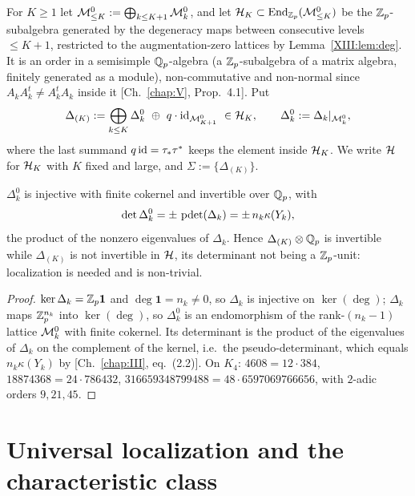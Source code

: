 \begin{definition}\label{XIII:def:order}
For $K\ge1$ let $\mathcal{M}^{0}_{\le K}:=\bigoplus_{k\le K+1}\mathcal{M}^{0}_k$, and let
$\mathcal{H}_K\subset\operatorname{End}_{\mathbb{Z}_p}(\mathcal{M}^{0}_{\le K})$ be the $\mathbb{Z}_p$-subalgebra generated by the degeneracy
maps between consecutive levels $\le K{+}1$, restricted to the augmentation-zero lattices by
Lemma~\ref{XIII:lem:deg}. It is an order in a semisimple $\mathbb{Q}_p$-algebra (a $\mathbb{Z}_p$-subalgebra of a
matrix algebra, finitely generated as a module), non-commutative and non-normal since
$A_kA_k^{t}\ne A_k^{t}A_k$ inside it {\rm[Ch.~\ref{chap:V}, Prop.~4.1]}. Put
\[
\Delta_{(K)}:=\bigoplus_{k\le K}\Delta_k^{0}\ \oplus\ q\cdot\mathrm{id}_{\cM^{0}_{K+1}}\ \in\cH_K,
\qquad \Delta_k^{0}:=\Delta_k|_{\cM^{0}_k},
\]
where the last summand $q\,\mathrm{id}=\tau_*\tau^*$ keeps the element inside $\mathcal{H}_K$. We write
$\mathcal{H}$ for $\mathcal{H}_K$ with $K$ fixed and large, and $\Sigma:=\{\Delta_{(K)}\}$.
\end{definition}

\begin{proposition}\label{XIII:prop:sigma}
$\Delta_k^{0}$ is injective with finite cokernel and invertible over $\mathbb{Q}_p$, with
\[
\det\Delta_k^{0}=\pm\,\operatorname{pdet}(\Delta_k)=\pm\,n_k\kappa(Y_k),
\]
the product of the nonzero eigenvalues of $\Delta_k$. Hence $\Delta_{(K)}\otimes\mathbb{Q}_p$ is
invertible while $\Delta_{(K)}$ is not invertible in $\mathcal{H}$, its determinant not being a
$\mathbb{Z}_p$-unit: localization is needed and is non-trivial.
\end{proposition}

\begin{proof}
$\ker\Delta_k=\mathbb{Z}_p\mathbf1$ and $\deg\mathbf1=n_k\ne0$, so $\Delta_k$ is injective on
$\ker(\deg)$; $\Delta_k$ maps $\mathbb{Z}_p^{n_k}$ into $\ker(\deg)$, so $\Delta_k^{0}$ is an
endomorphism of the rank-$(n_k-1)$ lattice $\mathcal{M}^{0}_k$ with finite cokernel. Its determinant
is the product of the eigenvalues of $\Delta_k$ on the complement of the kernel, i.e.\ the
pseudo-determinant, which equals $n_k\kappa(Y_k)$ by [Ch.~\ref{chap:III}, eq.~(2.2)]. On $K_4$:
$4608=12\cdot384$, $18874368=24\cdot786432$, $316659348799488=48\cdot6597069766656$, with
$2$-adic orders $9,21,45$.
\end{proof}

\section{Universal localization and the characteristic class}\label{XIII:sec:loc}

